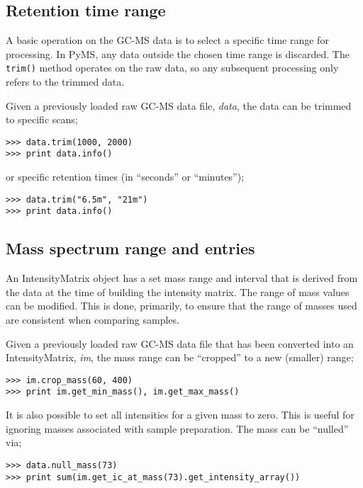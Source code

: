 \subsection{Retention time range}


A basic operation on the GC-MS data is to select a specific time range for
processing. In PyMS, any data outside the chosen time range is discarded. The
{\tt trim()} method operates on the raw data, so any subsequent processing only
refers to the trimmed data.

Given a previously loaded raw GC-MS data file, {\em data}, the data can be
trimmed to specific scans;

\begin{verbatim}
>>> data.trim(1000, 2000)
>>> print data.info()
\end{verbatim}

\noindent
or specific retention times (in ``seconds'' or ``minutes'');
\begin{verbatim}
>>> data.trim("6.5m", "21m")
>>> print data.info()
\end{verbatim}

\subsection{Mass spectrum range and entries}


An IntensityMatrix object has a set mass range and interval that is derived
from the data at the time of building the intensity matrix. The range of mass
values can be modified. This is done, primarily, to ensure that the range of
masses used are consistent when comparing samples.

Given a previously loaded raw GC-MS data file that has been converted into an
IntensityMatrix, {\em im}, the mass range can be ``cropped'' to a new (smaller)
range;

\begin{verbatim}
>>> im.crop_mass(60, 400)
>>> print im.get_min_mass(), im.get_max_mass()
\end{verbatim}

It is also possible to set all intensities for a given mass to zero. This is
useful for ignoring masses associated with sample preparation. The mass can be
``nulled'' via;

\begin{verbatim}
>>> data.null_mass(73)
>>> print sum(im.get_ic_at_mass(73).get_intensity_array())
\end{verbatim}

